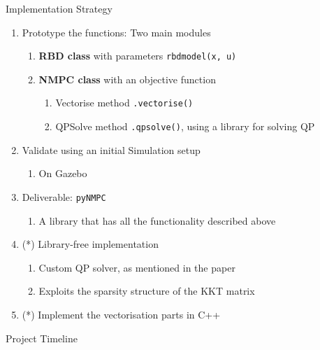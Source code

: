 \documentclass{beamer}
\begin{document}
\begin{frame}{Implementation Strategy}
    \setlength{\itemsep}{1em}
    \setlength{\parskip}{2pt}
    \begin{enumerate}\small
        \item Prototype the functions: Two main modules
            \begin{enumerate}\scriptsize
                \item \textbf{RBD class} with parameters \texttt{rbdmodel(x, u)}
                \item \textbf{NMPC class} with an objective function
                \begin{enumerate}\scriptsize
                    \item Vectorise method \texttt{.vectorise()}
                    \item QPSolve method \texttt{.qpsolve()}, using a library for solving QP
                \end{enumerate}
            \end{enumerate}
        \item Validate using an initial Simulation setup
            \begin{enumerate}\scriptsize
                \item On Gazebo
            \end{enumerate}
        \item Deliverable: \texttt{pyNMPC}\\
            \begin{enumerate}\scriptsize
                \item A library that has all the functionality described above
            \end{enumerate}
        \item (*) Library-free implementation
            \begin{enumerate}\scriptsize
                \item Custom QP solver, as mentioned in the paper
                \item Exploits the sparsity structure of the KKT matrix
            \end{enumerate}
        \item (*) Implement the vectorisation parts in C++
    \end{enumerate}

\end{frame}


\begin{frame}{Project Timeline}
	
\end{frame}
\end{document}
